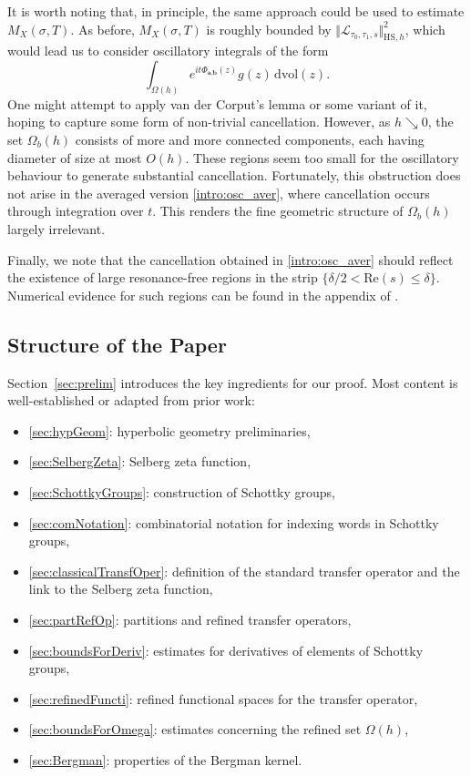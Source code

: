 \documentclass[12pt,letterpaper]{amsart}
\theoremstyle{plain}
\theoremstyle{definition}
\theoremstyle{remark}
\newcommand{\Aa}{\textbf{a}}
\newcommand{\Bb}{\textbf{b}}
\begin{document}
It is worth noting that, in principle, the same approach could be used to estimate \( M_X(\sigma, T) \). As before, \( M_X(\sigma, T) \) is roughly bounded by \( \Vert \mathcal{L}_{\tau_0,\tau_1,s} \Vert_{\mathrm{HS},h}^2 \), which would lead us to consider oscillatory integrals of the form
\begin{equation}\label{intro:osc}
\int_{\Omega(h)} e^{it  \Phi_{\Aa,\Bb}(z) }g(z) \, \mathrm{dvol}(z).
\end{equation}
One might attempt to apply van der Corput's lemma or some variant of it, hoping to capture some form of non-trivial cancellation. However, as $h\searrow 0$, the set \(\Omega_b(h)\) consists of more and more connected components, each having diameter of size at most $O(h)$. These regions seem too small for the oscillatory behaviour to generate substantial cancellation. Fortunately, this obstruction does not arise in the averaged version \eqref{intro:osc_aver}, where cancellation occurs through integration over $t$. This renders the fine geometric structure of $\Omega_b(h)$ largely irrelevant.

Finally, we note that the cancellation obtained in \eqref{intro:osc_aver} should reflect the existence of large resonance-free regions in the strip $\{  \delta/2 < \mathrm{Re}(s)\le \delta\}$. Numerical evidence for such regions can be found in the appendix of \cite{Dya19}.





\subsection{Structure of the Paper}
Section~\ref{sec:prelim} introduces the key ingredients for our proof. Most content is well-established or adapted from prior work:
\begin{itemize}
  	\item \ref{sec:hypGeom}: hyperbolic geometry preliminaries,
 	\item \ref{sec:SelbergZeta}: Selberg zeta function,
    \item \ref{sec:SchottkyGroups}: construction of Schottky groups,
    \item \ref{sec:comNotation}: combinatorial notation for indexing words in Schottky groups,
    \item \ref{sec:classicalTransfOper}: definition of the standard transfer operator and the link to the Selberg zeta function,
    \item \ref{sec:partRefOp}: partitions and refined transfer operators,
    \item \ref{sec:boundsForDeriv}: estimates for derivatives of elements of Schottky groups,
    \item \ref{sec:refinedFuncti}: refined functional spaces for the transfer operator,
    \item \ref{sec:boundsForOmega}: estimates concerning the refined set $\Omega(h)$,
    \item \ref{sec:Bergman}: properties of the Bergman kernel.
\end{itemize}
\end{document}

